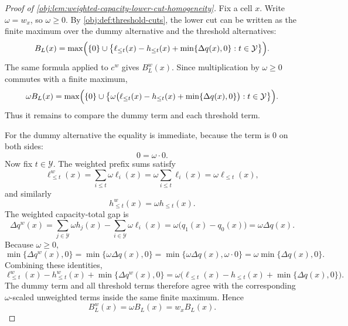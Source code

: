 \documentclass[11pt]{article}
\begin{document}
\begin{proof}[Proof of \cref{obj:lem:weighted-capacity-lower-cut-homogeneity}]
Fix a cell \(x\).  Write \(\omega=w_x\), so \(\omega\ge 0\).  By \cref{obj:def:threshold-cuts}, the lower cut can be written as the finite maximum over the dummy alternative and the threshold alternatives:
\[
B_L(x)
=
\max\Bigl(
\{0\}\cup
\bigl\{
\ell_{\le t}(x)-h_{\le t}(x)+\min\{\Delta q(x),0\}:t\in\mathcal Y
\bigr\}
\Bigr).
\]
The same formula applied to \(c^w\) gives \(B_L^w(x)\).  Since multiplication by \(\omega\ge0\) commutes with a finite maximum,
\[
\omega B_L(x)
=
\max\Bigl(
\{0\}\cup
\bigl\{
\omega\bigl(\ell_{\le t}(x)-h_{\le t}(x)+\min\{\Delta q(x),0\}\bigr):t\in\mathcal Y
\bigr\}
\Bigr).
\]
Thus it remains to compare the dummy term and each threshold term. %

For the dummy alternative the equality is immediate, because the term is \(0\) on both sides:
\[
0=\omega\cdot 0 .
\]
Now fix \(t\in\mathcal Y\).  The weighted prefix sums satisfy
\[
\ell_{\le t}^w(x)
=\sum_{i\le t}\omega\ell_i(x)
=\omega\sum_{i\le t}\ell_i(x)
=\omega\ell_{\le t}(x),
\]
and similarly
\[
h_{\le t}^w(x)=\omega h_{\le t}(x).
\]
The weighted capacity-total gap is
\[
\Delta q^w(x)
=
\sum_{j\in\mathcal Y}\omega h_j(x)
-
\sum_{i\in\mathcal Y}\omega\ell_i(x)
=
\omega\bigl(q_1(x)-q_0(x)\bigr)
=
\omega\Delta q(x).
\]
Because \(\omega\ge0\),
\[
\min\{\Delta q^w(x),0\}
=
\min\{\omega\Delta q(x),0\}
=
\min\{\omega\Delta q(x),\omega\cdot0\}
=
\omega\min\{\Delta q(x),0\}.
\]
Combining these identities,
\[
\ell_{\le t}^w(x)-h_{\le t}^w(x)+\min\{\Delta q^w(x),0\}
=
\omega\bigl(\ell_{\le t}(x)-h_{\le t}(x)+\min\{\Delta q(x),0\}\bigr).
\]
The dummy term and all threshold terms therefore agree with the corresponding \(\omega\)-scaled unweighted terms inside the same finite maximum.  Hence
\[
B_L^w(x)=\omega B_L(x)=w_xB_L(x).
\]
\end{proof}
\end{document}
